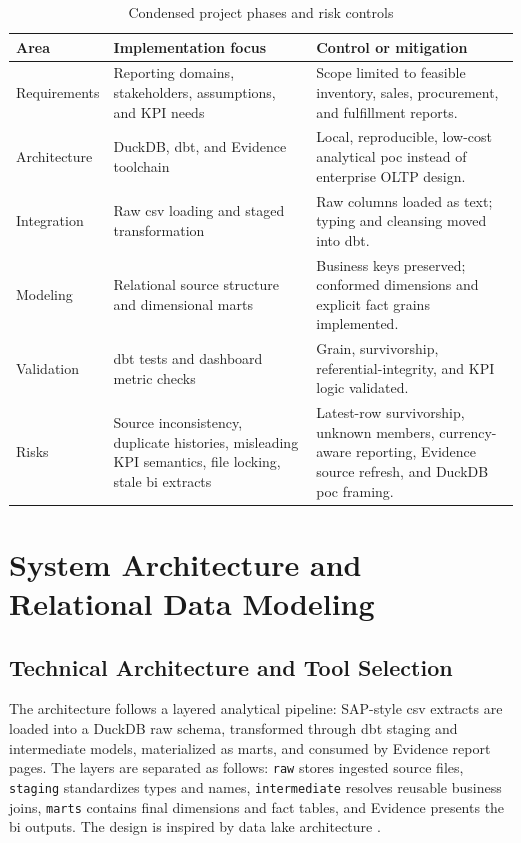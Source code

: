 \begin{table}[htbp]
\centering
\small
\label{tab:project-process-risks}
\begin{tabularx}{\textwidth}{p{}XX}
\hline
\textbf{Area} & \textbf{Implementation focus} & \textbf{Control or mitigation} \\
\hline
Requirements & Reporting domains, stakeholders, assumptions, and KPI needs & Scope limited to feasible inventory, sales, procurement, and fulfillment reports. \\
Architecture & DuckDB, \ac{dbt}, and Evidence toolchain & Local, reproducible, low-cost analytical \ac{poc} instead of enterprise OLTP design. \\
Integration & Raw \ac{csv} loading and staged transformation & Raw columns loaded as text; typing and cleansing moved into \ac{dbt}. \\
Modeling & Relational source structure and dimensional marts & Business keys preserved; conformed dimensions and explicit fact grains implemented. \\
Validation & \ac{dbt} tests and dashboard metric checks & Grain, survivorship, referential-integrity, and KPI logic validated. \\
Risks & Source inconsistency, duplicate histories, misleading KPI semantics, file locking, stale \ac{bi} extracts & Latest-row survivorship, unknown members, currency-aware reporting, Evidence source refresh, and DuckDB \ac{poc} framing. \\
\hline
\end{tabularx}
\caption{Condensed project phases and risk controls}
\normalsize
\end{table}

\section{System Architecture and Relational Data Modeling}

\subsection{Technical Architecture and Tool Selection}

The architecture follows a layered analytical pipeline: SAP-style \ac{csv} extracts are loaded into a DuckDB raw schema, transformed through \ac{dbt} staging and intermediate models, materialized as marts, and consumed by Evidence report pages. The layers are separated as follows: \texttt{raw} stores ingested source files, \texttt{staging} standardizes types and names, \texttt{intermediate} resolves reusable business joins, \texttt{marts} contains final dimensions and fact tables, and Evidence presents the \ac{bi} outputs. The design is inspired by \textcite{nambiar_overview_2022} data lake architecture \parencite[10-11]{nambiar_overview_2022}.

